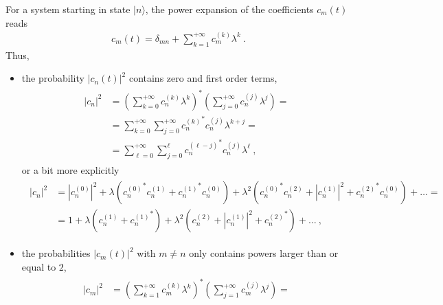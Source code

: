 \documentclass[letterpaper,10pt,english]{jupyterBook}
\begin{document}
\sphinxAtStartPar
{} For a system starting in state \(| n \rangle\), the power expansion of the coefficients \(c_m(t)\) reads
\begin{equation*}
\begin{split}
 c_m(t) = \delta_{mn} + \sum_{k=1}^{+\infty} c_m^{(k)} \lambda^k \ .
\end{split}
\end{equation*}
\sphinxAtStartPar
Thus,
\begin{itemize}
\item {} 
\sphinxAtStartPar
the probability \(|c_n(t)|^2\) contains zero and first order terms,
\begin{equation*}
\begin{split}\begin{aligned}
     |c_n|^2 
     & = \left( \sum_{k=0}^{+\infty} c_n^{(k)} \lambda^k \right)^* \left( \sum_{j=0}^{+\infty} c_n^{(j)} \lambda^j \right) = \\
     & = \sum_{k=0}^{+\infty} \sum_{j=0}^{+\infty} {c_n^{(k)}}^* c_n^{(j)} \lambda^{k+j} = \\
     & = \sum_{\ell=0}^{+\infty} \sum_{j=0}^{\ell} {c_n^{(\ell-j)}}^* c_n^{(j)} \lambda^{\ell} \ ,
   \end{aligned}\end{split}
\end{equation*}
\sphinxAtStartPar
or a bit more explicitly
\begin{equation*}
\begin{split}\begin{aligned}
     | c_n |^2 
     & =  |c_n^{(0)}|^2 + \lambda \left( {c_n^{(0)}}^* c_n^{(1)} + {c_n^{(1)}}^* c_n^{(0)} \right) + \lambda^2 \left( {c_n^{(0)}}^* c_n^{(2)} + | c_n^{(1)} |^2 + {c_n^{(2)}}^* c_n^{(0)}  \right) + \dots = \\
     & =  1 + \lambda \left( c_n^{(1)} + {c_n^{(1)}}^* \right) + \lambda^2 \left( c_n^{(2)} + | c_n^{(1)} |^2 + {c_n^{(2)}}^*  \right) + \dots \ ,
   \end{aligned}\end{split}
\end{equation*}
\item {} 
\sphinxAtStartPar
the probabilities \(|c_m(t)|^2\) with \(m \ne n\) only contains powers larger than or equal to \(2\),
\begin{equation*}
\begin{split}\begin{aligned}
     |c_m|^2 
     & = \left( \sum_{k=1}^{+\infty} c_m^{(k)} \lambda^k \right)^* \left( \sum_{j=1}^{+\infty} c_m^{(j)} \lambda^j \right) = \\

\end{aligned}
\end{split}
\end{equation*}
\end{itemize}
\end{document}
